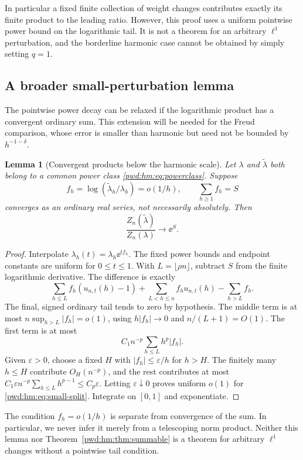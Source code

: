 \documentclass[11pt,letterpaper]{article}
\numberwithin{equation}{section}
\newtheorem{lemma}[theorem]{Lemma}
\theoremstyle{remark}\newtheorem{remark}[theorem]{Remark}
\begin{document}
In particular a fixed finite collection of weight changes contributes exactly its finite product to the leading ratio. However, this proof uses a uniform pointwise power bound on the logarithmic tail. It is not a theorem for an arbitrary $\ell^1$ perturbation, and the borderline harmonic case cannot be obtained by simply setting $q=1$.

\subsection{A broader small-perturbation lemma}
The pointwise power decay can be relaxed if the logarithmic product has a convergent ordinary sum. This extension will be needed for the Freud comparison, whose error is smaller than harmonic but need not be bounded by $h^{-1-\delta}$.

\begin{lemma}[Convergent products below the harmonic scale]\label{pwd:hm:lem:small-product}
Let $\lambda$ and $\widetilde\lambda$ both belong to a common power class \eqref{pwd:hm:eq:powerclass}. Suppose
\[
 f_h=\log(\widetilde\lambda_h/\lambda_h)=o(1/h),\qquad
 \sum_{h\ge1}f_h=S
\]
converges as an ordinary real series, not necessarily absolutely. Then
\begin{equation}\label{pwd:hm:eq:small-product}
 \frac{Z_n(\widetilde\lambda)}{Z_n(\lambda)}\longrightarrow\ee^S.
\end{equation}
\end{lemma}
\begin{proof}
Interpolate $\lambda_h(t)=\lambda_h\ee^{tf_h}$. The fixed power bounds and endpoint constants are uniform for $0\le t\le1$. With $L=\lfloor\rho n\rfloor$, subtract $S$ from the finite logarithmic derivative. The difference is exactly
\begin{equation}\label{pwd:hm:eq:small-split}
 \sum_{h\le L}f_h(u_{n,t}(h)-1)
 +\sum_{L<h\le n}f_hu_{n,t}(h)-\sum_{h>L}f_h.
\end{equation}
The final, signed ordinary tail tends to zero by hypothesis. The middle term is at most $n\sup_{h>L}|f_h|=o(1)$, using $h|f_h|\to0$ and $n/(L+1)=O(1)$. The first term is at most
\[
 C_1n^{-p}\sum_{h\le L}h^p|f_h|.
\]
Given $\varepsilon>0$, choose a fixed $H$ with $|f_h|\le\varepsilon/h$ for $h>H$. The finitely many $h\le H$ contribute $O_H(n^{-p})$, and the rest contributes at most
$C_1\varepsilon n^{-p}\sum_{h\le L}h^{p-1}\le C_p\varepsilon$. Letting $\varepsilon\downarrow0$ proves uniform $o(1)$ for \eqref{pwd:hm:eq:small-split}. Integrate on $[0,1]$ and exponentiate.
\end{proof}
The condition $f_h=o(1/h)$ is separate from convergence of the sum. In particular, we never infer it merely from a telescoping norm product. Neither this lemma nor Theorem~\ref{pwd:hm:thm:summable} is a theorem for arbitrary $\ell^1$ changes without a pointwise tail condition.
\end{document}
